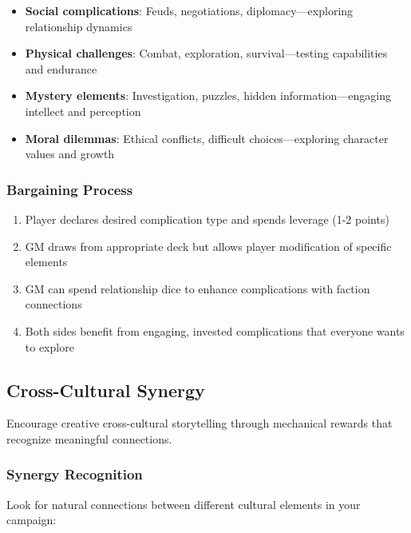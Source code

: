 \begin{itemize}
    \item \textbf{Social complications}: Feuds, negotiations, diplomacy—exploring relationship dynamics
    \item \textbf{Physical challenges}: Combat, exploration, survival—testing capabilities and endurance
    \item \textbf{Mystery elements}: Investigation, puzzles, hidden information—engaging intellect and perception
    \item \textbf{Moral dilemmas}: Ethical conflicts, difficult choices—exploring character values and growth
\end{itemize}

\subsubsection*{Bargaining Process}

\begin{enumerate}
    \item Player declares desired complication type and spends leverage (1-2 points)
    \item GM draws from appropriate deck but allows player modification of specific elements
    \item GM can spend relationship dice to enhance complications with faction connections
    \item Both sides benefit from engaging, invested complications that everyone wants to explore
\end{enumerate}

\subsection*{Cross-Cultural Synergy}

Encourage creative cross-cultural storytelling through mechanical rewards that recognize meaningful connections.

\subsubsection*{Synergy Recognition}

Look for natural connections between different cultural elements in your campaign:


